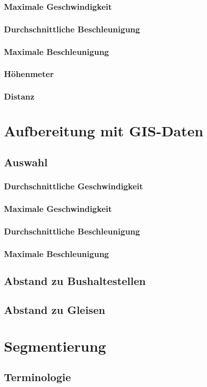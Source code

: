 \subsubsection{Maximale Geschwindigkeit}
\subsubsection{Durchschnittliche Beschleunigung}
\subsubsection{Maximale Beschleunigung}
\subsubsection{Höhenmeter}
\subsubsection{Distanz}
\clearpage

\section{Aufbereitung mit GIS-Daten}
\subsection{Auswahl}
\subsubsection{Durchschnittliche Geschwindigkeit}
\subsubsection{Maximale Geschwindigkeit}
\subsubsection{Durchschnittliche Beschleunigung}
\subsubsection{Maximale Beschleunigung}
\subsection{Abstand zu Bushaltestellen}
\subsection{Abstand zu Gleisen}
\clearpage

\section{Segmentierung}
\subsection{Terminologie}
